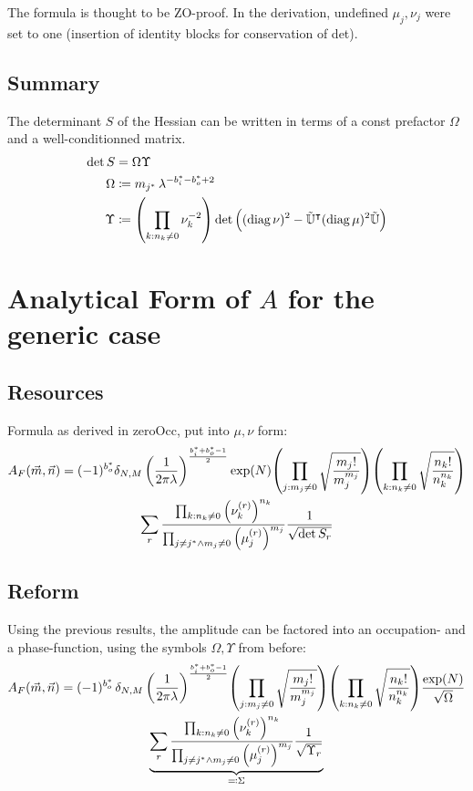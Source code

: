 \documentclass[
	english,
	a4paper,
	fontsize=10pt,
	parskip=half,
	titlepage=true,
	DIV=12,
	final
]{scrreprt}
\newcommand*{\transp}{\ensuremath{^\intercal}}
\DeclareMathOperator{\diag}{diag}
\begin{document}
The formula is thought to be ZO-proof. In the derivation, undefined $\mu_j, \nu_j$ were set to one (insertion of identity blocks for conservation of det).

\section{Summary}
The determinant $S$ of the Hessian can be written in terms of a const prefactor $\Omega$ and a well-conditionned matrix.
\begin{align*}
	\det S &= \Omega \Upsilon \\
	\Omega &\coloneqq m_{j^*} \, \lambda^{-b^*_i - b^*_o + 2} \\
	\Upsilon
&\coloneqq
	\qty( \prod_{k: n_k \neq 0} \nu_k^{-2} )
	\det\qty( \Big.
		(\diag \nu)^2 	-
		\tilde{\mathbb{U}}\transp
		(\diag \mu)^2
		\tilde{\mathbb{U}}
	)
\end{align*}

\chapter{Analytical Form of $A$ for the generic case}
\section{Resources}
Formula as derived in zeroOcc, put into $\mu, \nu$ form:
\begin{multline}
	A_F(\vec{m}, \vec{n})
=
	(-1)^{b_o^*}
	\delta_{N,M} \, \qty(
		\frac{1}{2\pi\lambda}
	)^{\frac{b_i^* + b_o^* - 1}{2}}
	\exp(N)
	\qty( \prod_{j : m_j \neq 0}
		\sqrt{\frac
			{ m_j! }
			{ m_j^{m_j} }
	})
	\qty( \prod_{k : n_k \neq 0}
		\sqrt{\frac
			{ n_k! }
			{ n_k^{n_k} }
	})
\\
	\sum_r
		\frac
			{\prod_{k             : n_k \neq 0} \qty(\nu_k^{(r)})^{n_k}}
			{\prod_{j\neq j^* \land m_j \neq 0} \qty(\mu_j^{(r)})^{m_j}}
		\frac
			{1}
			{\sqrt{\det S_r}}
\end{multline}

\section{Reform}
Using the previous results, the amplitude can be factored into an occupation- and a phase-function, using the symbols $\Omega, \Upsilon$ from before:
\begin{multline}
	A_F(\vec{m}, \vec{n})
=
	(-1)^{b_o^*} \,
	\delta_{N,M} \, \qty(
		\frac{1}{2\pi\lambda}
	)^{\frac{b_i^* + b_o^* - 1}{2}}
	\qty( \prod_{j : m_j \neq 0}
		\sqrt{\frac
			{ m_j! }
			{ m_j^{m_j} }
	})
	\qty( \prod_{k : n_k \neq 0}
		\sqrt{\frac
			{ n_k! }
			{ n_k^{n_k} }
	})
	\frac
		{\exp(N)}
		{\sqrt{\Omega}}
\\
	\underbrace{
	\sum_r
		\frac
			{\prod_{k             : n_k \neq 0} \qty(\nu_k^{(r)})^{n_k}}
			{\prod_{j\neq j^* \land m_j \neq 0} \qty(\mu_j^{(r)})^{m_j}}
		\frac
			{1}
			{\sqrt{\Upsilon_r}}
	}_{\eqqcolon \Sigma}
\label{eqn:Amplitude}
\end{multline}
\end{document}
